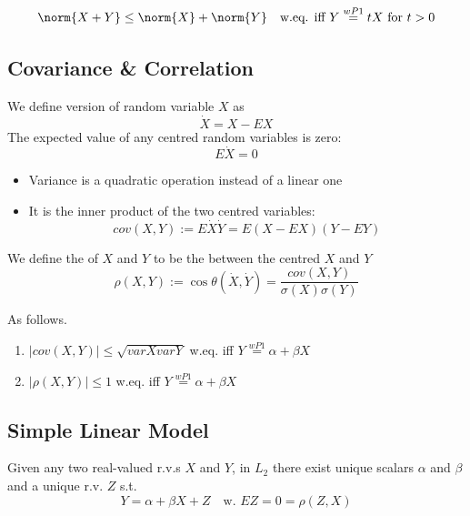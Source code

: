 \documentclass[11pt]{article}
\numberwithin{equation}{section}
\begin{document}
\begin{equation}
	\norm{X + Y} \leq \norm{X} + \norm{Y} \quad \text{w.eq. iff $Y \overset{wP1}{=} tX$ for $t > 0$}
\end{equation}

\subsection{Covariance \& Correlation}
 We define  version of random variable $X$ as 
$$\dot{X} = X - EX$$
The expected value of any centred random variables is zero:
$$E\dot{X} = 0$$
\remark
\begin{itemize}
	\item Variance is a quadratic operation instead of a linear one
	\item It is the inner product of the two centred variables:
	\begin{equation}
		cov(X, Y) := E\dot{X}\dot{Y} = E(X-EX)(Y-EY)
	\end{equation}
\end{itemize}

We define the  of $X$ and $Y$ to be the  between the centred $X$ and $Y$
\begin{equation}
	\rho(X, Y):= \cos \theta(\dot{X}, \dot{Y}) = \frac{cov(X, Y)}{\sigma(X)\sigma(Y)}
\end{equation} 


As follows.
\begin{enumerate}
	\item $|cov(X, Y)| \leq \sqrt{varXvarY}$ w.eq. iff $Y \overset{wP1}{=} \alpha + \beta X$
	\item $|\rho(X,Y)| \leq 1$ w.eq. iff $Y \overset{wP1}{=} \alpha + \beta X$ 
\end{enumerate}

\subsection{Simple Linear Model}
\proposition Given any two real-valued r.v.s $X$ and $Y$, in $L_2$ there exist unique scalars $\alpha$ and $\beta$ and a unique r.v. $Z$ s.t.
\begin{equation}
	Y = \alpha + \beta X + Z \quad \text{w. $EZ = 0 = \rho(Z, X)$}
\end{equation}
\end{document}
